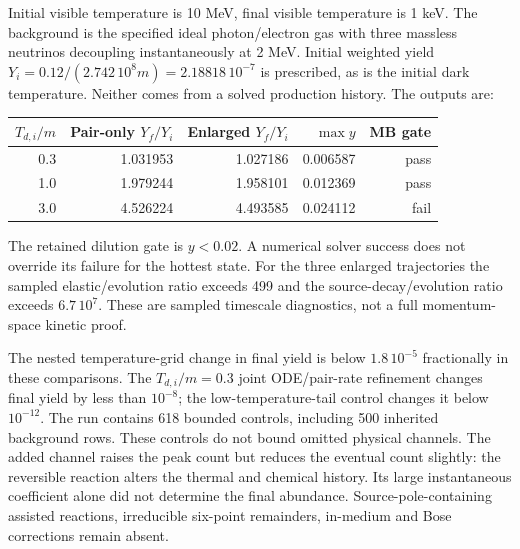 \documentclass[11pt]{article}
\begin{document}
Initial visible temperature is 10 MeV, final visible temperature is 1 keV.
The background is the specified ideal photon/electron gas with three
massless neutrinos decoupling instantaneously at 2 MeV. Initial weighted
yield $Y_i=0.12/(2.742\,10^8m)=2.18818\,10^{-7}$ is prescribed,
as is the initial dark temperature. Neither comes from a solved production
history. The outputs are:
\begin{center}
\begin{tabular}{rrrrr}
\toprule
$T_{d,i}/m$ & Pair-only $Y_f/Y_i$ & Enlarged $Y_f/Y_i$ & $\max y$ & MB gate\\
\midrule
0.3 & 1.031953 & 1.027186 & 0.006587 & pass\\
1.0 & 1.979244 & 1.958101 & 0.012369 & pass\\
3.0 & 4.526224 & 4.493585 & 0.024112 & fail\\
\bottomrule
\end{tabular}
\end{center}
The retained dilution gate is $y<0.02$. A numerical solver success does
not override its failure for the hottest state. For the three enlarged
trajectories the sampled elastic/evolution ratio exceeds 499 and the
source-decay/evolution ratio exceeds $6.7\,10^7$. These are sampled
timescale diagnostics, not a full momentum-space kinetic proof.

The nested temperature-grid change in final yield is below
$1.8\,10^{-5}$ fractionally in these comparisons. The $T_{d,i}/m=0.3$
joint ODE/pair-rate refinement changes final yield by less than $10^{-8}$;
the low-temperature-tail control changes it below $10^{-12}$. The run
contains 618 bounded controls, including 500 inherited background rows.
These controls do not bound omitted physical channels.
The added channel raises the peak count but reduces the eventual count
slightly: the reversible reaction alters the thermal and chemical history.
Its large instantaneous coefficient alone did not determine the final
abundance. Source-pole-containing assisted reactions, irreducible
six-point remainders, in-medium and Bose corrections remain absent.
\end{document}
